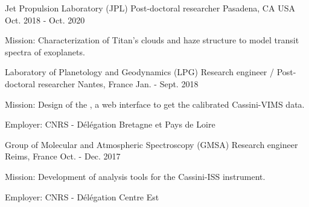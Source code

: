 
\begin{cventries}

  \cventry
    {Jet Propulsion Laboratory (JPL)}
    {Post-doctoral researcher}
    {Pasadena, CA USA}
    {Oct. 2018 - Oct. 2020}
    {
      \begin{cvitems}
        \item{Mission: Characterization of Titan's clouds and haze structure to model transit spectra of exoplanets.}
      \end{cvitems}
      \vspace{1em}
    }

  \cventry
    {Laboratory of Planetology and Geodynamics (LPG)}
    {Research engineer / Post-doctoral researcher}
    {Nantes, France}
    {Jan. - Sept. 2018}
    {
      \begin{cvitems}
        \item{Mission: Design of the
        ,
        a web interface to get the calibrated Cassini-VIMS data.}
        \item{Employer: CNRS - Délégation Bretagne et Pays de Loire}
      \end{cvitems}
      \vspace{1em}
    }

  \cventry
    {Group of Molecular and Atmospheric Spectroscopy (GMSA)}
    {Research engineer}
    {Reims, France}
    {Oct. - Dec. 2017}
    {
      \begin{cvitems}
        \item{Mission: Development of analysis tools for the Cassini-ISS instrument.}
        \item{Employer: CNRS - Délégation Centre Est}
      \end{cvitems}
      \vspace{1em}
    }

\end{cventries}
